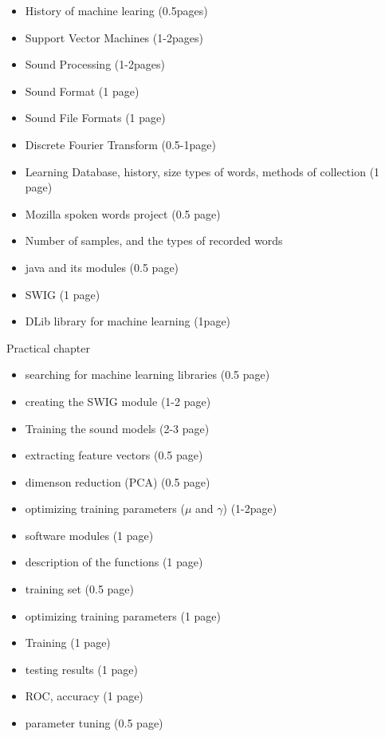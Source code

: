 \documentclass[english,12pt,oneside,a4paper]{article}
\begin{document}
\begin{center}
\newpage
	\begin{itemize}
		\item History of machine learing (0.5pages)
		\item Support Vector Machines (1-2pages)
		\item Sound Processing (1-2pages)
		\item Sound Format (1 page)
		\item Sound File Formats (1 page)
		\item Discrete Fourier Transform (0.5-1page)
		\item Learning Database, history, size types of words, methods of collection (1 page)
		\item Mozilla spoken words project (0.5 page)
		\item Number of samples, and the types of recorded words
		\item java and its modules (0.5 page)
		\item SWIG (1 page)
		\item DLib library for machine learning (1page)
	\end{itemize}
	Practical chapter
	\begin{itemize}
		\item searching for machine learning libraries (0.5 page)
		\item creating the SWIG module (1-2 page)
		\item Training the sound models (2-3 page)
		\item extracting feature vectors (0.5 page)
		\item dimenson reduction (PCA) (0.5 page)
		\item optimizing training parameters ($\mu$ and $\gamma$) (1-2page)
		\item software modules (1 page)
		\item description of the functions (1 page)
		\item training set (0.5 page)
		\item optimizing training parameters (1 page)
		\item Training (1 page)
		\item testing results (1 page)
		\item ROC, accuracy (1 page)
		\item parameter tuning (0.5 page)
	\end{itemize}
	

\end{center}
\end{document}
